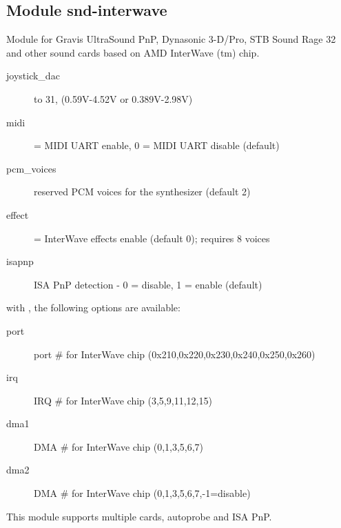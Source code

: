 \documentclass[a4paper,8pt,english]{sphinxmanual}
\begin{document}
\subsection{Module snd-interwave}
\label{sound/alsa-configuration:module-snd-interwave}
Module for Gravis UltraSound PnP, Dynasonic 3-D/Pro, STB Sound Rage 32
and other sound cards based on AMD InterWave (tm) chip.
\begin{description}
\item[{joystick\_dac}]  to 31, (0.59V-4.52V or 0.389V-2.98V)

\item[{midi}]  = MIDI UART enable, 0 = MIDI UART disable (default)

\item[{pcm\_voices}] \leavevmode
reserved PCM voices for the synthesizer (default 2)

\item[{effect}]  = InterWave effects enable (default 0); requires 8 voices

\item[{isapnp}] \leavevmode
ISA PnP detection - 0 = disable, 1 = enable (default)

\end{description}

with , the following options are available:
\begin{description}
\item[{port}] \leavevmode
port \# for InterWave chip (0x210,0x220,0x230,0x240,0x250,0x260)

\item[{irq}] \leavevmode
IRQ \# for InterWave chip (3,5,9,11,12,15)

\item[{dma1}] \leavevmode
DMA \# for InterWave chip (0,1,3,5,6,7)

\item[{dma2}] \leavevmode
DMA \# for InterWave chip (0,1,3,5,6,7,-1=disable)

\end{description}

This module supports multiple cards, autoprobe and ISA PnP.
\end{document}
